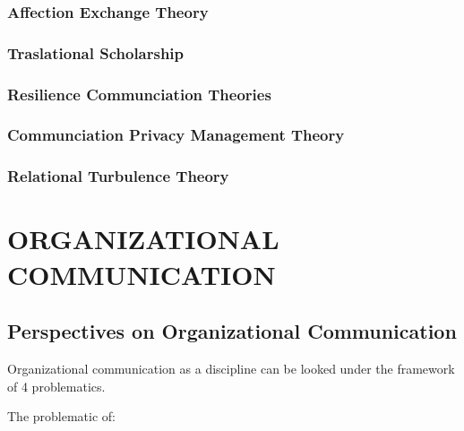 \documentclass[
]{book}
\begin{document}
\hypertarget{affection-exchange-theory}{%
\section{Affection Exchange Theory}\label{affection-exchange-theory}}

\hypertarget{traslational-scholarship}{%
\section{Traslational Scholarship}\label{traslational-scholarship}}

\hypertarget{resilience-communciation-theories}{%
\section{Resilience Communciation Theories}\label{resilience-communciation-theories}}

\hypertarget{communciation-privacy-management-theory}{%
\section{Communciation Privacy Management Theory}\label{communciation-privacy-management-theory}}

\hypertarget{relational-turbulence-theory}{%
\section{Relational Turbulence Theory}\label{relational-turbulence-theory}}

\hypertarget{part-organizational-communication}{%
\part{ORGANIZATIONAL COMMUNICATION}\label{part-organizational-communication}}

\hypertarget{perspectives-on-organizational-communication}{%
\chapter{Perspectives on Organizational Communication}\label{perspectives-on-organizational-communication}}

\citep{Mumby_1996}
Organizational communication as a discipline can be looked under the framework of 4 problematics.

The problematic of:
\end{document}
